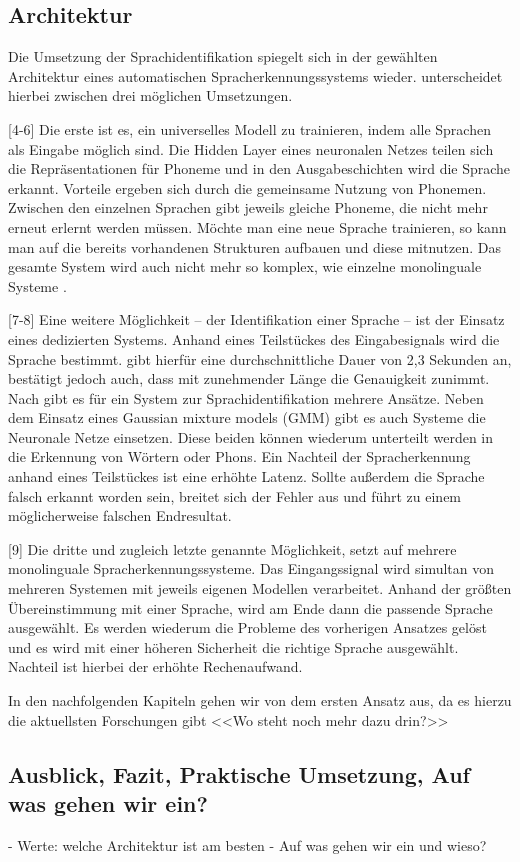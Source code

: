 \subsection{Architektur}
\cite{Gonzalez.2015} Die Umsetzung der Sprachidentifikation spiegelt sich in der gewählten Architektur eines automatischen Spracherkennungssystems wieder. \cite{Gonzalez.2015} unterscheidet hierbei zwischen drei möglichen Umsetzungen.

[4-6] Die erste ist es, ein universelles Modell zu trainieren, indem alle Sprachen als Eingabe möglich sind. Die Hidden Layer eines neuronalen Netzes teilen sich die Repräsentationen für Phoneme und in den Ausgabeschichten wird die Sprache erkannt.
Vorteile ergeben sich durch die gemeinsame Nutzung von Phonemen. Zwischen den einzelnen Sprachen gibt jeweils gleiche Phoneme, die nicht mehr erneut erlernt werden müssen. Möchte man eine neue Sprache trainieren, so kann man auf die bereits vorhandenen Strukturen aufbauen und diese mitnutzen.
Das gesamte System wird auch nicht mehr so komplex, wie einzelne monolinguale Systeme \cite{Bartz.2017}.

[7-8] Eine weitere Möglichkeit – der Identifikation einer Sprache – ist der Einsatz eines dedizierten Systems. Anhand eines Teilstückes des Eingabesignals wird die Sprache bestimmt. \cite{Niesler.2006} gibt hierfür eine durchschnittliche Dauer von 2,3 Sekunden an, bestätigt jedoch auch, dass mit zunehmender Länge die Genauigkeit zunimmt.
Nach \cite{Niesler.2006} gibt es für ein System zur Sprachidentifikation mehrere Ansätze. Neben dem Einsatz eines Gaussian mixture models (GMM) gibt es auch Systeme die Neuronale Netze einsetzen. Diese beiden können wiederum unterteilt werden in die Erkennung von Wörtern oder Phons.
Ein Nachteil der Spracherkennung anhand eines Teilstückes ist eine erhöhte Latenz. Sollte außerdem die Sprache falsch erkannt worden sein, breitet sich der Fehler aus und führt zu einem möglicherweise falschen Endresultat.

[9] Die dritte und zugleich letzte genannte Möglichkeit, setzt auf mehrere monolinguale Spracherkennungssysteme. Das Eingangssignal wird simultan von mehreren Systemen mit jeweils eigenen Modellen verarbeitet.
Anhand der größten Übereinstimmung mit einer Sprache, wird am Ende dann die passende Sprache ausgewählt. Es werden wiederum die Probleme des vorherigen Ansatzes gelöst und es wird mit einer höheren Sicherheit die richtige Sprache ausgewählt.
Nachteil ist hierbei der erhöhte Rechenaufwand.

In den nachfolgenden Kapiteln gehen wir von dem ersten Ansatz aus, da es hierzu die aktuellsten Forschungen gibt \cite{Gonzalez.2015} <<Wo steht noch mehr dazu drin?>>

\subsection{Ausblick, Fazit, Praktische Umsetzung, Auf was gehen wir ein?}
- Werte: welche Architektur ist am besten
- Auf was gehen wir ein und wieso?